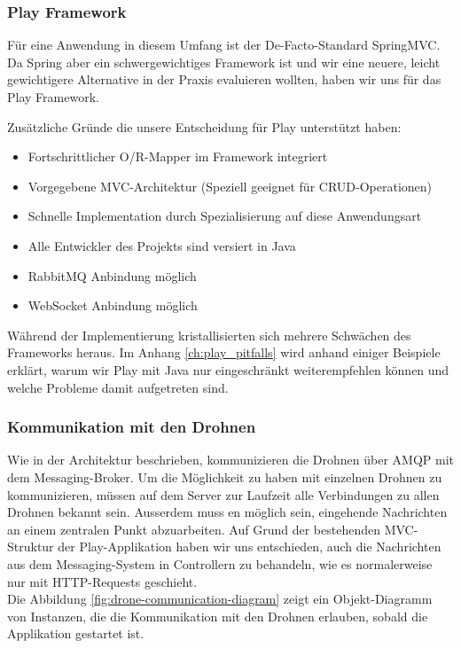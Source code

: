 \subsubsection{Play Framework}
Für eine Anwendung in diesem Umfang ist der De-Facto-Standard SpringMVC. Da Spring aber ein schwergewichtiges Framework ist und wir eine neuere, leicht gewichtigere Alternative in der Praxis evaluieren wollten, haben wir uns für das Play Framework.

Zusätzliche Gründe die unsere Entscheidung für Play unterstützt haben:

\begin{itemize}
    \item Fortschrittlicher O/R-Mapper im Framework integriert
    \item Vorgegebene MVC-Architektur (Speziell geeignet für CRUD-Operationen)
    \item Schnelle Implementation durch Spezialisierung auf diese Anwendungsart 
    \item Alle Entwickler des Projekts sind versiert in Java
    \item RabbitMQ Anbindung möglich
    \item WebSocket Anbindung möglich
\end{itemize}

Während der Implementierung kristallisierten sich mehrere Schwächen des Frameworks heraus. 
Im Anhang \ref{ch:play_pitfalls} wird anhand einiger Beispiele erklärt, warum wir Play mit Java nur eingeschränkt weiterempfehlen können und welche Probleme damit aufgetreten sind.

\subsubsection{Kommunikation mit den Drohnen}

Wie in der Architektur beschrieben, kommunizieren die Drohnen über AMQP mit dem Messaging-Broker. Um die Möglichkeit zu haben mit einzelnen Drohnen zu kommunizieren, müssen auf dem Server zur Laufzeit alle Verbindungen zu allen Drohnen bekannt sein. Ausserdem muss en möglich sein, eingehende Nachrichten an einem zentralen Punkt abzuarbeiten. Auf Grund der bestehenden MVC-Struktur der Play-Applikation haben wir uns entschieden, auch die Nachrichten aus dem Messaging-System in Controllern zu behandeln, wie es normalerweise nur mit HTTP-Requests geschieht.\\

Die Abbildung \ref{fig:drone-communication-diagram} zeigt ein Objekt-Diagramm von Instanzen, die die Kommunikation mit den Drohnen erlauben, sobald die Applikation gestartet ist.

